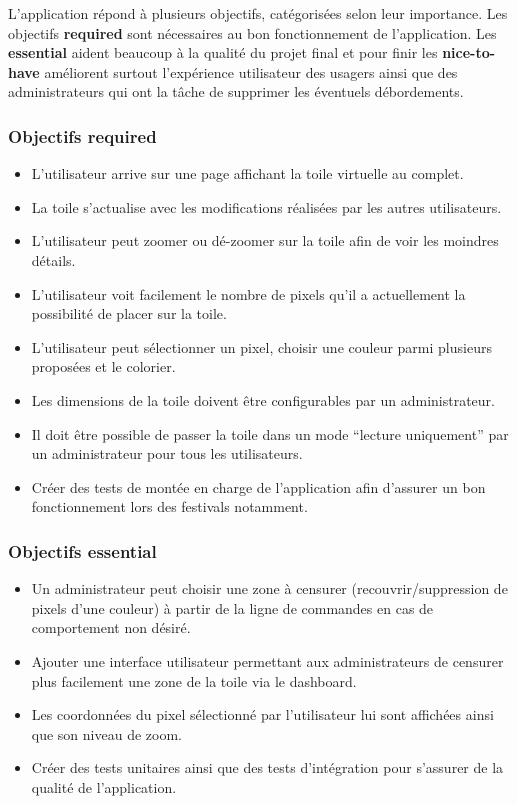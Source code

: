 L'application répond à plusieurs objectifs, catégorisées selon leur importance. Les objectifs \textbf{required} sont nécessaires au bon fonctionnement de l'application. Les \textbf{essential} aident beaucoup à la qualité du projet final et pour finir les \textbf{nice-to-have} améliorent surtout l'expérience utilisateur des usagers ainsi que des administrateurs qui ont la tâche de supprimer les éventuels débordements.

\subsubsection{Objectifs \guillemotleft required\guillemotright}

\begin{itemize}
  \item L'utilisateur arrive sur une page affichant la toile virtuelle au complet.
  \item La toile s'actualise avec les modifications réalisées par les autres utilisateurs.
  \item L'utilisateur peut zoomer ou dé-zoomer sur la toile afin de voir les moindres détails.
  \item L'utilisateur voit facilement le nombre de pixels qu'il a actuellement la possibilité de placer sur la toile.
  \item L'utilisateur peut sélectionner un pixel, choisir une couleur parmi plusieurs proposées et le colorier.
  \item Les dimensions de la toile doivent être configurables par un administrateur.
  \item Il doit être possible de passer la toile dans un mode “lecture uniquement” par un administrateur pour tous les utilisateurs.
  \item Créer des tests de montée en charge de l'application afin d'assurer un bon fonctionnement lors des festivals notamment.
\end{itemize}

\subsubsection{Objectifs \guillemotleft essential\guillemotright}

\begin{itemize}
  \item Un administrateur peut choisir une zone à censurer (recouvrir/suppression de pixels d'une couleur) à partir de la ligne de commandes en cas de comportement non désiré.
  \item Ajouter une interface utilisateur permettant aux administrateurs de censurer plus facilement une zone de la toile via le dashboard.
  \item Les coordonnées du pixel sélectionné par l'utilisateur lui sont affichées ainsi que son niveau de zoom.
  \item Créer des tests unitaires ainsi que des tests d'intégration pour s'assurer de la qualité de l'application.
\end{itemize}

